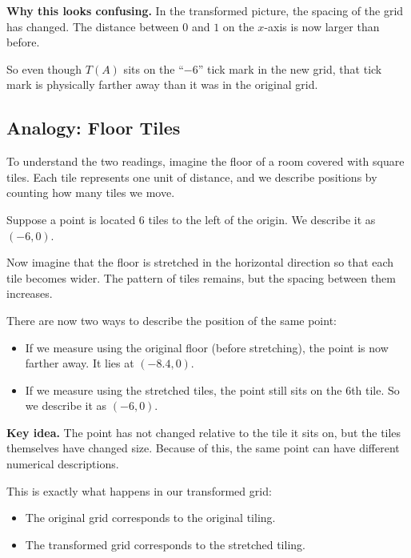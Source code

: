 \documentclass[11pt,openany]{book}
\theoremstyle{definition}
\begin{document}
\medskip

\textbf{Why this looks confusing.} In the transformed picture, the spacing of the grid has changed. 
The distance between $0$ and $1$ on the $x$-axis is now larger than before. 

\medskip

So even though $T(A)$ sits on the ``$-6$'' tick mark in the new grid, that tick mark is physically 
farther away than it was in the original grid.

\medskip

\subsection{Analogy: Floor Tiles}

To understand the two readings, imagine the floor of a room covered with square tiles. 
Each tile represents one unit of distance, and we describe positions by counting how many tiles we move.

\medskip

Suppose a point is located 6 tiles to the left of the origin. We describe it as $(-6, 0)$.

\medskip

Now imagine that the floor is stretched in the horizontal direction so that each tile becomes wider. 
The pattern of tiles remains, but the spacing between them increases.

\medskip

There are now two ways to describe the position of the same point:

\begin{itemize}
  \item If we measure using the original floor (before stretching), the point is now farther away. 
  It lies at $(-8.4, 0)$.

  \item If we measure using the stretched tiles, the point still sits on the 6th tile. 
  So we describe it as $(-6, 0)$.
\end{itemize}

\medskip

\textbf{Key idea.} The point has not changed relative to the tile it sits on, but the tiles themselves 
have changed size. Because of this, the same point can have different numerical descriptions.

\medskip

This is exactly what happens in our transformed grid:

\begin{itemize}
  \item The original grid corresponds to the original tiling.
  \item The transformed grid corresponds to the stretched tiling.
\end{itemize}
\end{document}
